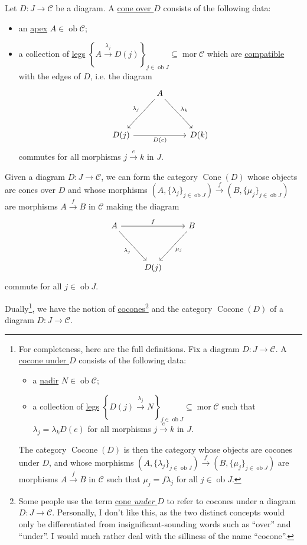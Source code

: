 \documentclass[a4paper,11pt]{article}
\theoremstyle{break_italics}
\theoremstyle{break_upright}
\theoremstyle{remark}
\newcommand{\ob}{\operatorname{ob}}
\newcommand{\mor}{\operatorname{mor}}
\newcommand{\C}{\mathcal{C}}
\begin{document}
Let $D \colon J \to \C$ be a diagram. A \uline{cone over $D$} consists of the following data:
\begin{itemize}
	\item an \uline{apex} $A \in \ob\C$;
	\item a collection of \uline{legs} $\left\{A \xrightarrow{\lambda_j} D(j)\right\}_{j\in\ob J} \subseteq \mor\C$ which are \uline{compatible} with the edges of $D$, i.e. the diagram
		\[
\begin{tikzcd}
                         & A \arrow[ldd, "\lambda_j"'] \arrow[rdd, "\lambda_k"] &      \\
                         &                                                      &      \\
D(j) \arrow[rr, "D(e)"'] &                                                      & D(k)
\end{tikzcd}
		\]
		commutes for all morphisms $j\xrightarrow{e}k$ in $J$.
\end{itemize}
Given a diagram $D \colon J \to \C$, we can form the category $\operatorname{Cone}(D)$ whose objects are cones over $D$ and whose morphisms $(A, \{\lambda_j\}_{j \in \ob J}) \xrightarrow{f} (B, \{\mu_j\}_{j \in \ob J})$ are morphisms $A \xrightarrow{f} B$ in $\C$ making the diagram
\[
\begin{tikzcd}
A \arrow[rdd, "\lambda_j"'] \arrow[rr, "f"] &      & B \arrow[ldd, "\mu_j"] \\
                                            &      &                        \\
                                            & D(j) &                       
\end{tikzcd}
\]
commute for all $j \in \ob J$.

Dually\footnote{For completeness, here are the full definitions. Fix a diagram $D \colon J \to \C$. A \uline{cocone under $D$} consists of the following data:
\begin{itemize}
	\item a \uline{nadir} $N \in \ob\C$;
	\item a collection of \uline{legs} $\left\{D(j) \xrightarrow{\lambda_j} N\right\}_{j\in\ob J} \subseteq \mor\C$ such that $\lambda_j = \lambda_k D(e)$ for all morphisms $j \xrightarrow{e} k$ in $J$.
\end{itemize}
The category $\operatorname{Cocone}(D)$ is then the category whose objects are cocones under $D$, and whose morphisms $(A, \{\lambda_j\}_{j \in \ob J}) \xrightarrow{f} (B, \{\mu_j\}_{j \in \ob J})$ are morphisms $A \xrightarrow{f} B$ in $\C$ such that $\mu_j = f\lambda_j$ for all $j\in\ob J$.}, we have the notion of \uline{cocones}\footnote{Some people use the term \uline{cone \textit{under} $D$} to refer to cocones under a diagram $D \colon J \to \C$. Personally, I don't like this, as the two distinct concepts would only be differentiated from insignificant-sounding words such as ``over'' and ``under''. I would much rather deal with the silliness of the name ``cocone''.} and the category $\operatorname{Cocone}(D)$ of a diagram $D \colon J \to \C$. 
\end{document}
